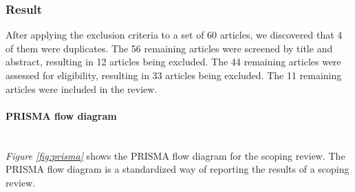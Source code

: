 \documentclass[12pt]{article}
\newcommand{\subsubsubsection}[1]{\paragraph{#1}\mbox{}\\}
\begin{document}
\subsubsection{Result}
After applying the exclusion criteria to a set of 60 articles, we discovered that 4 of them were duplicates.
The 56 remaining articles were screened by title and abstract, resulting in 12 articles being excluded.
The 44 remaining articles were assessed for eligibility, resulting in 33 articles being excluded.
The 11 remaining articles were included in the review.

\subsubsubsection{PRISMA flow diagram}
\textit{Figure \ref{fig:prisma}} shows the PRISMA \cite{PRISMAStatement} flow diagram for the scoping review.
The PRISMA flow diagram is a standardized way of reporting the results of a scoping review.
\end{document}
